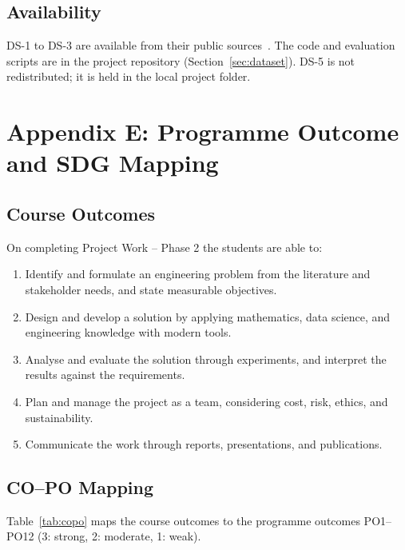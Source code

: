 \section{Availability}
DS-1 to DS-3 are available from their public sources~\cite{roboflowcap,fillds1,fillds2}. The code and evaluation scripts are in the project repository (Section~\ref{sec:dataset}). DS-5 is not redistributed; it is held in the local project folder.

\chapter{Appendix E: Programme Outcome and SDG Mapping}
\label{appendix:po}

\section{Course Outcomes}
On completing Project Work -- Phase 2 the students are able to:
\begin{enumerate}
    \item[\textbf{CO1.}] Identify and formulate an engineering problem from the literature and stakeholder needs, and state measurable objectives.
    \item[\textbf{CO2.}] Design and develop a solution by applying mathematics, data science, and engineering knowledge with modern tools.
    \item[\textbf{CO3.}] Analyse and evaluate the solution through experiments, and interpret the results against the requirements.
    \item[\textbf{CO4.}] Plan and manage the project as a team, considering cost, risk, ethics, and sustainability.
    \item[\textbf{CO5.}] Communicate the work through reports, presentations, and publications.
\end{enumerate}

\section{CO--PO Mapping}
Table~\ref{tab:copo} maps the course outcomes to the programme outcomes PO1--PO12 (3: strong, 2: moderate, 1: weak).

